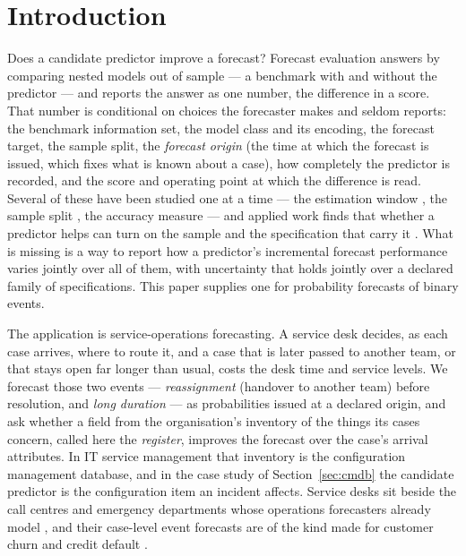 \documentclass[11pt,3p,review,authoryear]{elsarticle}
\theoremstyle{definition}
\begin{document}
\section{Introduction}
\label{sec:intro}

Does a candidate predictor improve a forecast? Forecast evaluation answers by
comparing nested models out of sample --- a benchmark with and without the
predictor \citep{clark2001nested,clark2007approximately} --- and reports the
answer as one number, the difference in a score. That number is conditional
on choices the forecaster makes and seldom reports: the benchmark information
set, the model class and its encoding, the forecast target, the sample split,
the \emph{forecast origin} (the time at which the forecast is issued, which
fixes what is known about a case), how completely the predictor is recorded,
and the score and operating point at which the difference is read. Several
of these have been studied one at a time --- the estimation window
\citep{rossi2012window}, the sample split \citep{hansen2012sample}, the
accuracy measure \citep{kolassa2020best} --- and applied work finds that
whether a predictor helps can turn on the sample and the specification that
carry it \citep{stock2003forecasting,welch2008comprehensive,banbura2023phillips}. What is missing is a way to report how a
predictor's incremental forecast performance varies jointly over all of them,
with uncertainty that holds jointly over a declared family of specifications. This paper supplies one
for probability forecasts of binary events.

The application is service-operations forecasting. A service desk decides,
as each case arrives, where to route it, and a case that is later passed to
another team, or that stays open far longer than usual, costs the desk time
and service levels. We forecast those two events --- \emph{reassignment}
(handover to another team) before resolution, and \emph{long duration} --- as
probabilities issued at a declared origin, and ask whether a field from the
organisation's inventory of the things its cases concern, called here the
\emph{register}, improves the forecast over the case's arrival attributes. In
IT service management that inventory is the configuration management
database, and in the case study of Section~\ref{sec:cmdb} the candidate
predictor is the configuration item an incident affects. Service desks sit
beside the call centres and emergency departments whose operations
forecasters already model \citep{ibrahim2016modeling,rostamitabar2022anticipating},
and their case-level event forecasts are of the kind made for customer churn
and credit default \citep{decaigny2020incorporating,liu2023tree}.
\end{document}
